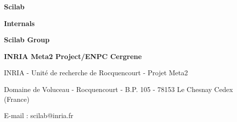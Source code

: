 
\pagestyle{empty}


\hspace*{-2.cm}

\newpage

\vspace{8.cm}

{\Huge\bf  {Scilab}}

{\Huge\bf  {Internals}}

\vspace{3.cm}

{\Huge\bf {Scilab Group}}

{\Large\bf
INRIA Meta2 Project/ENPC Cergrene}

\normalsize

\vspace{12.cm}

INRIA - Unit\'e de recherche de Rocquencourt - Projet Meta2

Domaine de Voluceau - Rocquencourt - B.P. 105 - 78153 Le Chesnay Cedex (France)

E-mail : scilab@inria.fr

\newpage
\mbox{ }
\newpage

\normalsize

